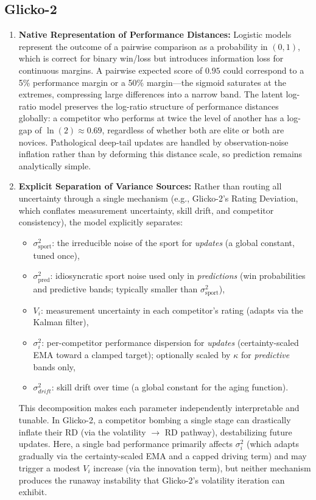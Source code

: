 \documentclass[12pt]{article}
\begin{document}
	\subsection{Glicko-2}
	\begin{enumerate}
		\item \textbf{Native Representation of Performance Distances:} Logistic models represent the outcome of a pairwise comparison as a probability in $(0, 1)$, which is correct for binary win/loss but introduces information loss for continuous margins. A pairwise expected score of $0.95$ could correspond to a 5\% performance margin or a 50\% margin---the sigmoid saturates at the extremes, compressing large differences into a narrow band. The latent log-ratio model preserves the log-ratio structure of performance distances globally: a competitor who performs at twice the level of another has a log-gap of $\ln(2) \approx 0.69$, regardless of whether both are elite or both are novices. Pathological deep-tail updates are handled by observation-noise inflation rather than by deforming this distance scale, so prediction remains analytically simple.

		\item \textbf{Explicit Separation of Variance Sources:} Rather than routing all uncertainty through a single mechanism (e.g., Glicko-2's Rating Deviation, which conflates measurement uncertainty, skill drift, and competitor consistency), the model explicitly separates:
		\begin{itemize}
			\item $\sigma_{\mathrm{sport}}^2$: the irreducible noise of the sport for \emph{updates} (a global constant, tuned once),
			\item $\sigma_{\mathrm{pred}}^2$: idiosyncratic sport noise used only in \emph{predictions} (win probabilities and predictive bands; typically smaller than $\sigma_{\mathrm{sport}}^2$),
			\item $V_i$: measurement uncertainty in each competitor's rating (adapts via the Kalman filter),
			\item $\sigma_i^2$: per-competitor performance dispersion for \emph{updates} (certainty-scaled EMA toward a clamped target); optionally scaled by $\kappa$ for \emph{predictive} bands only,
			\item $\sigma_{drift}^2$: skill drift over time (a global constant for the aging function).
		\end{itemize}
		This decomposition makes each parameter independently interpretable and tunable. In Glicko-2, a competitor bombing a single stage can drastically inflate their RD (via the volatility $\rightarrow$ RD pathway), destabilizing future updates. Here, a single bad performance primarily affects $\sigma_i^2$ (which adapts gradually via the certainty-scaled EMA and a capped driving term) and may trigger a modest $V_i$ increase (via the innovation term), but neither mechanism produces the runaway instability that Glicko-2's volatility iteration can exhibit.
	\end{enumerate}
\end{document}
